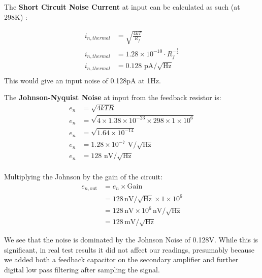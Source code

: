 The \textbf{Short Circuit Noise Current} at input can be calculated as such (at 298K) \cite[p.439]{RefWorks:horowitz2015theart}:

\begin{equation} \label{Thermal Current Noise}
  \begin{split}
  i_{n,thermal} &= \sqrt{\frac{4kT}{R_f}} \\
  i_{n,thermal} &= 1.28 \times 10^{-10} \cdot R_f^{-\frac{1}{2}} \\
  i_{n,thermal} &= 0.128\text{ pA}/\sqrt{\text{Hz}} \\
  \end{split}
  \end{equation}
This would give an input noise of 0.128pA at 1Hz.

The \textbf{Johnson-Nyquist Noise} at input from the feedback resistor is:
\begin{equation} \label{JohnsNoiseRf}
  \begin{split}
  e_n &= \sqrt{4kTR} \\
  e_n &= \sqrt{4 \times 1.38 \times 10^{-23} \times 298 \times 1 \times 10^6} \\
  e_n &= \sqrt{1.64 \times 10^{-14}} \\
  e_n &= 1.28 \times 10^{-7} \text{ V}/\sqrt{\text{Hz}} \\
  e_n &= 128 \text{ nV}/\sqrt{\text{Hz}} \\
  \end{split}
  \end{equation}


Multiplying the Johnson by the gain of the circuit:
\begin{equation} \label{Amplified Voltage Noise}
  \begin{split}
    e_{n,\text{out}} &= e_n \times \text{Gain} \\
    &= 128\,\text{nV}/\sqrt{\text{Hz}} \times 1 \times 10^6 \\
    &= 128\,\text{nV} \times 10^6\,\text{nV}/\sqrt{\text{Hz}} \\
    &= 128\,\text{mV}/\sqrt{\text{Hz}}
  \end{split}
\end{equation}

We see that the noise is dominated by the Johnson Noise of 0.128V.  While this is significant, in real test results it did not affect our readings, presumably because we added both a feedback capacitor on the secondary amplifier and further digital low pass filtering after sampling the signal. 

